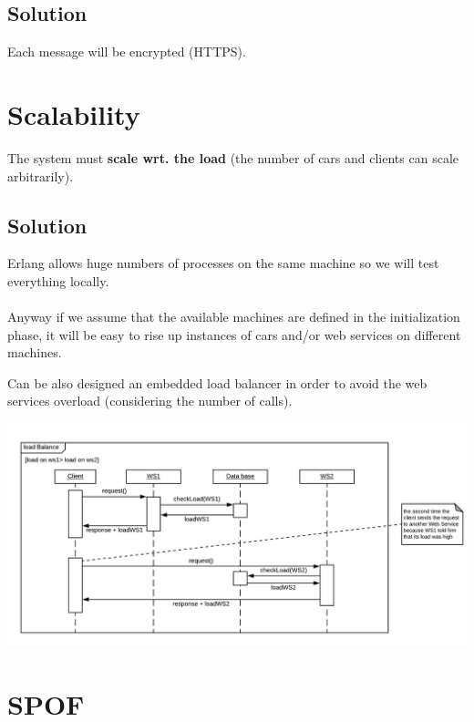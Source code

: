\subsection{Solution}

Each message will be encrypted (HTTPS).


\section{Scalability}

The system must \textbf{scale wrt. the load} 
(the number of cars and clients can scale arbitrarily).


\subsection{Solution}

Erlang allows huge numbers of processes on the same machine so we will 
test everything locally.\\

\noindent
{}\\

\noindent
Anyway if we assume that the available machines are defined in the initialization phase,
it will be easy to rise up instances of cars and/or web services on different machines.

Can be also designed an embedded load balancer in order to avoid the web services overload 
(considering the number of calls).

\begin{center}
    \includegraphics[scale=0.6]{assets/ds2019_2.png}
\end{center}


\section{SPOF}

